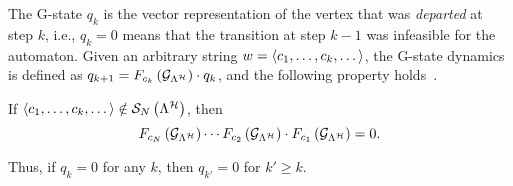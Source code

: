 %
The G-state $q_k$ is the vector representation of the vertex that was \emph{departed} at step $k$, i.e., $q_k=0$ means that the transition at step $k-1$ was infeasible for the automaton. 
Given an arbitrary string $w=\left\langle c_1,\dots,c_k,\dots\right\rangle$, the G-state dynamics is defined as $q_{k+1} = F_{c_k}\left( \mathcal{G}_{\Lambda^{\mathcal{H}}} \right) \cdot q_k$, and the following property holds~\cite{xu2012matrix}.
%
\begin{lemma}%
    \label{cor:Fseqnotinlambda}%
    If $\left\langle c_1,\dots,c_k,\dots\right\rangle \notin \mathcal{S}_{N}\left(  \Lambda^{\mathcal{H}}  \right)$, then 
    \begin{equation*}
        F_{c_N}\left( \mathcal{G}_{\Lambda^{\mathcal{H}}} \right) \cdots F_{c_2}\left( \mathcal{G}_{\Lambda^{\mathcal{H}}} \right) \cdot F_{c_1}\left( \mathcal{G}_{\Lambda^{\mathcal{H}}} \right) = 0.
    \end{equation*}
\end{lemma}
Thus, if $q_k=0$ for any $k$, then $q_{k'}=0$ for $k' \geq k$.
